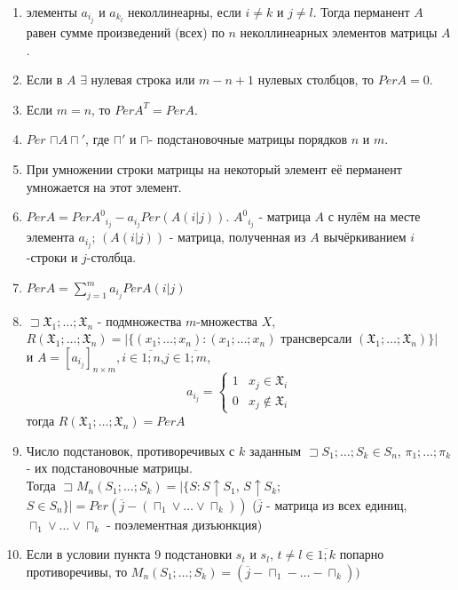 \prop
\begin{enumerate}
	\item \opr элементы $a_{i_j}$ и $a_{k_l}$ неколлинеарны, если $i\neq k$ и $j\neq l$. Тогда перманент $A$ равен сумме произведений (всех) по $n$ неколлинеарных элементов матрицы $A$.
	\item Если в $A$ $\exists$ нулевая строка или $m-n+1$ нулевых столбцов, то $Per A=0$.
 	\item Если $m=n$, то $Per A^T = Per A$.
	\item $Per$ $\sqcap A\sqcap'$, где $\sqcap'$ и $\sqcap$- подстановочные матрицы порядков $n$ и $m$.
	\item При умножении строки матрицы на некоторый элемент её перманент умножается на этот элемент.
	\item $Per A=Per {A^0}_{i_j} - a_{i_j} Per(A(i|j))$. ${A^0}_{i_j}$ - матрица $A$ с нулём на месте элемента $a_{i_j}$; $(A(i|j))$ - матрица, полученная из $A$ вычёркиванием $i$-строки и $j$-столбца.
	\item $Per A = \sum\limits_{j=1}^m a_{i_j} Per A(i|j)$
	\item $\sqsupset \mathfrak{X}_1; \ldots;\mathfrak{X}_n$ - подмножества $m$-множества $X$, \\$R(\mathfrak{X}_1;\ldots;\mathfrak{X}_n)=|\{(x_1;\ldots;x_n):(x_1;\ldots;x_n)$ трансверсали $(\mathfrak{X}_1;\ldots;\mathfrak{X}_n)\}|$ \\и $A=[a_{i_j}]_{n \times m},i\in\overline{1;n}$,$j\in\overline{1;m}$,  
        \begin{equation*}
            a_{i_j} = 
            \begin{cases}
            1 &\text{$x_j \in \mathfrak{X}_i$}\\
            0 &\text{$x_j \notin \mathfrak{X}_i$}
            \end{cases}
            \end{equation*}
            тогда $R(\mathfrak{X}_1;\ldots;\mathfrak{X}_n)=PerA$
    \item Число подстановок, противоречивых с $k$ заданным $\sqsupset S_1;\ldots;S_k \in S_n$, $\pi_1;\ldots;\pi_k$ - их подстановочные матрицы. \\ Тогда $\sqsupset M_n(S_1;\ldots;S_k)=|\{S:S\uparrow S_1$, $S\uparrow S_k$; $S\in S_n \} | = Per(\overline j-(\sqcap_1\vee \ldots \vee \sqcap_k))$ ($\overline j$ - матрица из всех единиц, $\sqcap_1\vee \ldots \vee \sqcap_k$ - поэлементная дизъюнкция)
    \item Если в условии пункта 9 подстановки $s_t$ и $s_l$, $t \neq l \in \overline{1;k}$ попарно противоречивы, то $M_n(S_1; \ldots; S_k)=(\overline j - \sqcap_1 - \ldots - \sqcap_k))$

\end{enumerate}
